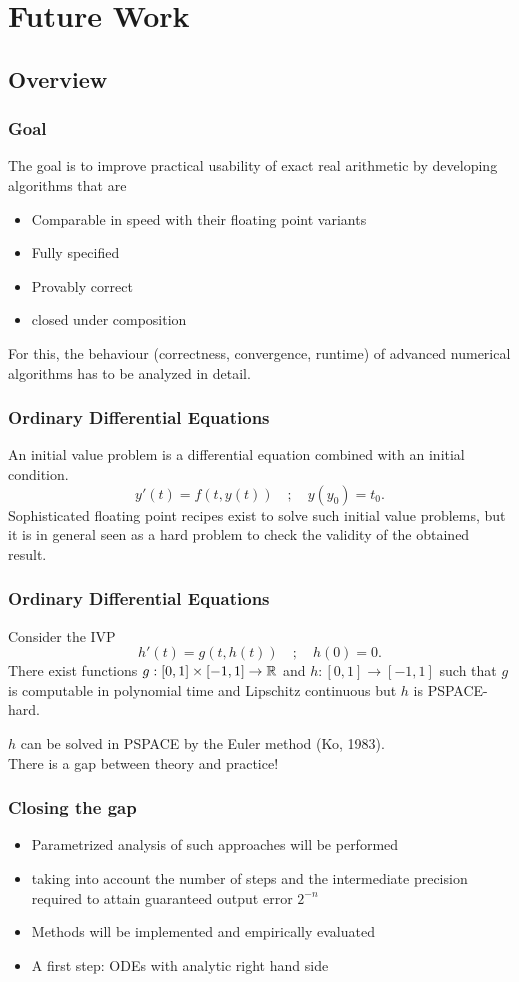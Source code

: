 \section{Future Work}
\subsection{Overview}
\begin{frame}[<+->]
\frametitle{Goal}
The goal is to improve practical usability of exact real arithmetic by developing algorithms that are
\pause
\begin{itemize}
	\item Comparable in speed with their floating point variants
	\item Fully specified
	\item Provably correct
	\item closed under composition
\end{itemize}
\pause
For this, the behaviour (correctness, convergence, runtime) of advanced numerical algorithms has to be analyzed in detail. 
\end{frame}
\begin{frame}[<+->]
\frametitle{Ordinary Differential Equations}
An initial value problem is a differential equation combined with an initial 
condition.
$$
y'(t)=f(t,y(t)) \quad;\quad y(y_0)=t_0.
$$
\pause
Sophisticated floating point recipes exist to solve such initial value problems, but it is in general seen as a 
hard problem to check the validity of the obtained result.
\end{frame}
\begin{frame}
\frametitle{Ordinary Differential Equations}
\begin{theorem}[Kawamura, 2010]
Consider the IVP
$$
h'(t)=g(t,h(t)) \quad;\quad h(0)=0.
$$
\pause
There exist functions $g: [0,1] \times [-1,1] \to \mathbb{R}$ and $h: [0,1] \to [-1,1]$
such that $g$ is computable in polynomial time and Lipschitz continuous
but $h$ is PSPACE-hard.
\end{theorem}
\pause
$h$ can be solved in PSPACE by the Euler method (Ko, 1983).\\
There is a gap between theory and practice!
\end{frame}
\begin{frame}[<+->]
\frametitle{Closing the gap}
\begin{itemize}
	\item Parametrized analysis of such approaches will be performed
	\item taking
into account the number of steps and the intermediate precision required to attain guaranteed
output error $2^{-n}$
	\item Methods will be implemented and empirically evaluated
	\item A first step: ODEs with analytic right hand side
\end{itemize}
\end{frame}